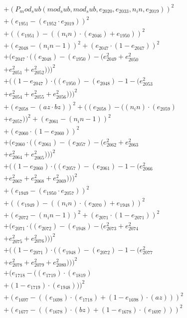 \documentclass[10pt, a4paper]{article}
\begin{document}
\begin{small}
\begin{align*}
& + (P_mod_sub(mod_sub, mod_sub, e_{2020}, e_{2033}, n_in, e_{2019}))^{2} \\
& + (e_{1951} - (e_{1952}  \cdot  e_{2019}))^{2} \\
& + ((e_{1951}) - ((n_in)  \cdot  (e_{2046}) + e_{1950}))^{2} \\
& + (e_{2048} - (n_in - 1))^{2} + (e_{2047}  \cdot  (1 - e_{2047}))^{2} \\
& + (e_{2047}  \cdot  ((e_{2048}) - (e_{1950}) - (e_{2049}^{2} + e_{2050}^{2} \\
& + e_{2051}^{2} + e_{2052}^{2})))^{2} \\
& + ((1 - e_{2047})  \cdot  ((e_{1950}) - (e_{2048}) - 1 - (e_{2053}^{2} \\
& + e_{2054}^{2} + e_{2055}^{2} + e_{2056}^{2})))^{2} \\
& + (e_{2058} - (az  \cdot  bz))^{2} + ((e_{2058}) - ((n_in)  \cdot  (e_{2059}) \\
& + e_{2057}))^{2} + (e_{2061} - (n_in - 1))^{2} \\
& + (e_{2060}  \cdot  (1 - e_{2060}))^{2} \\
& + (e_{2060}  \cdot  ((e_{2061}) - (e_{2057}) - (e_{2062}^{2} + e_{2063}^{2} \\
& + e_{2064}^{2} + e_{2065}^{2})))^{2} \\
& + ((1 - e_{2060})  \cdot  ((e_{2057}) - (e_{2061}) - 1 - (e_{2066}^{2} \\
& + e_{2067}^{2} + e_{2068}^{2} + e_{2069}^{2})))^{2} \\
& + (e_{1949} - (e_{1950}  \cdot  e_{2057}))^{2} \\
& + ((e_{1949}) - ((n_in)  \cdot  (e_{2070}) + e_{1948}))^{2} \\
& + (e_{2072} - (n_in - 1))^{2} + (e_{2071}  \cdot  (1 - e_{2071}))^{2} \\
& + (e_{2071}  \cdot  ((e_{2072}) - (e_{1948}) - (e_{2073}^{2} + e_{2074}^{2} \\
& + e_{2075}^{2} + e_{2076}^{2})))^{2} \\
& + ((1 - e_{2071})  \cdot  ((e_{1948}) - (e_{2072}) - 1 - (e_{2077}^{2} \\
& + e_{2078}^{2} + e_{2079}^{2} + e_{2080}^{2})))^{2} \\
& + (e_{1718} - ((e_{1719})  \cdot  (e_{1819}) \\
& + (1 - e_{1719})  \cdot  (e_{1948})))^{2} \\
& + (e_{1697} - ((e_{1698})  \cdot  (e_{1718}) + (1 - e_{1698})  \cdot  (az)))^{2} \\
& + (e_{1677} - ((e_{1678})  \cdot  (bz) + (1 - e_{1678})  \cdot  (e_{1697})))^{2} \\

\end{align*}
\end{small}
\end{document}
